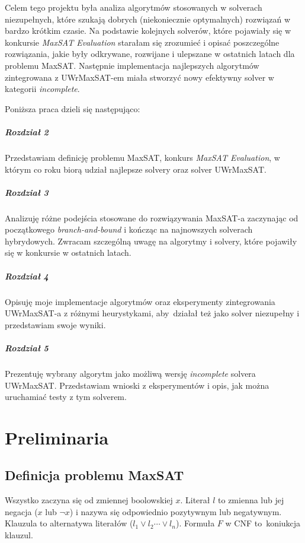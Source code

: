 \documentclass[shortabstract]{iithesis}
\begin{document}
Celem tego projektu była analiza algorytmów stosowanych w solverach niezupełnych, które szukają dobrych (niekoniecznie optymalnych) rozwiązań w bardzo krótkim czasie. Na podstawie kolejnych solverów, które pojawiały się w konkursie \textit{MaxSAT Evaluation} starałam się zrozumieć i opisać poszczególne rozwiązania, jakie były odkrywane, rozwijane i ulepszane w ostatnich latach dla problemu MaxSAT. Następnie implementacja najlepszych algorytmów zintegrowana z UWrMaxSAT-em miała stworzyć nowy efektywny solver w kategorii \textit{incomplete}.

\noindent
Poniższa praca dzieli się następująco:
\paragraph{Rozdział 2} Przedstawiam definicję problemu MaxSAT, konkurs \textit{MaxSAT Evaluation}, w którym co roku biorą udział najlepsze solvery oraz solver UWrMaxSAT.
\paragraph{Rozdział 3} Analizuję różne podejścia stosowane do rozwiązywania MaxSAT-a zaczynając od początkowego \textit{branch-and-bound} i kończąc na najnowszych solverach hybrydowych. Zwracam szczególną uwagę na algorytmy i solvery, które pojawiły się w konkursie w ostatnich latach.
\paragraph{Rozdział 4} Opisuję moje implementacje algorytmów oraz eksperymenty zintegrowania UWrMaxSAT-a z różnymi heurystykami, aby~działał też jako solver niezupełny i przedstawiam swoje wyniki.
\paragraph{Rozdział 5} Prezentuję wybrany algorytm jako możliwą wersję \textit{incomplete} solvera UWrMaxSAT. Przedstawiam wnioski z eksperymentów i opis, jak można uruchamiać testy z tym solverem. 

\chapter{Preliminaria}
\section{Definicja problemu MaxSAT}
Wszystko zaczyna się od zmiennej boolowskiej $x$. Literał $l$ to zmienna lub jej negacja ($x$ lub $\neg x$) i nazywa się odpowiednio pozytywnym lub negatywnym. Klauzula to alternatywa literałów ($l_1 \lor l_2 \cdots \lor l_n$). Formuła $F$ w CNF to~koniukcja klauzul.
\end{document}
